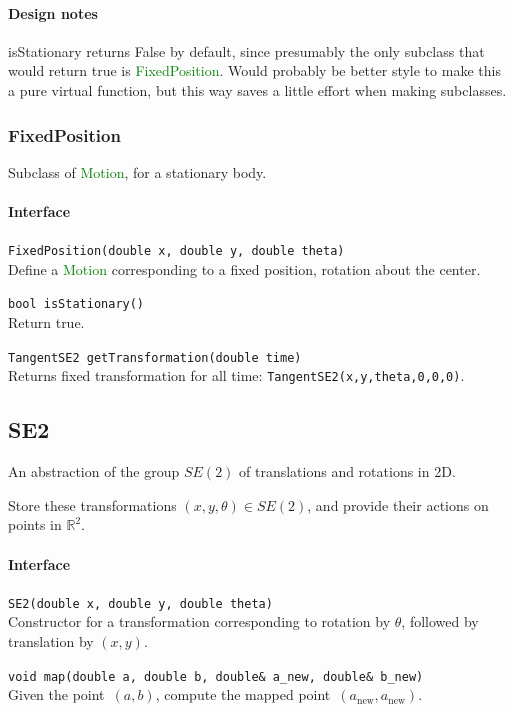 \documentclass[11pt]{article}
\def\class#1{\textcolor{green}{\ttfamily\small #1}} %
\def\fn#1{{\ttfamily\small #1}} %
\let\code\lstinline
\begin{document}
\paragraph{Design notes}
\fn{isStationary} returns False by default, since presumably the only subclass that would return true is \class{FixedPosition}.  Would probably be better style to make this a pure virtual function, but this way saves a little effort when making subclasses.

\subsubsection{FixedPosition}
Subclass of \class{Motion}, for a stationary body.

\paragraph{Interface}
\begin{description}
	\item \code|FixedPosition(double x, double y, double theta)| \\
		Define a \class{Motion} corresponding to a fixed position, rotation about the center.
	\item \code|bool isStationary()|\\
		Return true.
	\item \code|TangentSE2 getTransformation(double time)|\\
		Returns fixed transformation for all time: \code|TangentSE2(x,y,theta,0,0,0)|.
\end{description}


\subsection{SE2}
An abstraction of the group $SE(2)$ of translations and rotations in 2D.

Store these transformations $(x,y,\theta)\in SE(2)$, and provide their actions on points in $\mathbb{R}^2$.

\paragraph{Interface}
\begin{description}
	\item \code|SE2(double x, double y, double theta)|\\
		Constructor for a transformation corresponding to rotation by $\theta$, followed by translation by $(x,y)$.
	\item \code|void map(double a, double b, double& a_new, double& b_new)|\\
		Given the point~$(a,b)$, compute the mapped point~$(a_\text{new},a_\text{new})$.
\end{description}
\end{document}
